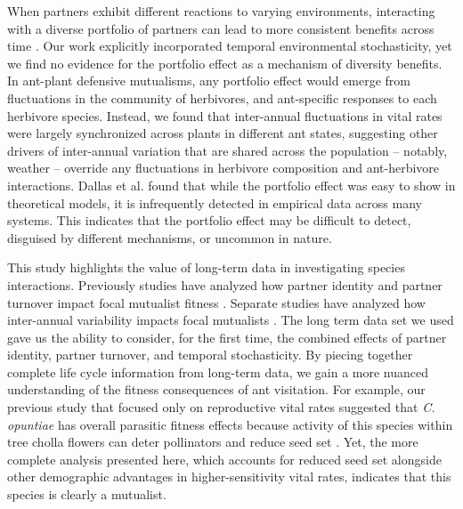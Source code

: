 \documentclass[11pt]{article}
\begin{document}
When partners exhibit different reactions to varying environments, interacting with a diverse portfolio of partners can lead to more consistent benefits across time \citep{Batstone2018}.
Our work explicitly incorporated temporal environmental stochasticity, yet we find no evidence for the portfolio effect as a mechanism of diversity benefits. 
In ant-plant defensive mutualisms, any portfolio effect would emerge from fluctuations in the community of herbivores, and ant-specific responses to each herbivore species. 
Instead, we found that inter-annual fluctuations in vital rates were largely synchronized across plants in different ant states, suggesting other drivers of inter-annual variation that are shared across the population -- notably, weather -- override any fluctuations in herbivore composition and ant-herbivore interactions. 
Dallas et al. \citeyear{dallas2022temporal} found that while the portfolio effect was easy to show in theoretical models, it is infrequently detected in empirical data across many systems. 
This indicates that the portfolio effect may be difficult to detect, disguised by different mechanisms, or uncommon in nature. 

This study highlights the value of long-term data in investigating species interactions. 
Previously studies have analyzed how partner identity and partner turnover impact focal mutualist fitness \citep{Fonseca2003, Dejean2008, Noe1994, Barrett2015, Bruna2014, Trojelsgaard2015}.
Separate studies have analyzed how inter-annual variability impacts focal mutualists \citep{Alonso1998, Alarcon2008, Ollerton2006, Horvitz1990, Lazaro2022}.
The long term data set we used gave us the ability to consider, for the first time, the combined effects of partner identity, partner turnover, and temporal stochasticity. 
By piecing together complete life cycle information from long-term data, we gain a more nuanced understanding of the fitness consequences of ant visitation. 
For example, our previous study that focused only on reproductive vital rates suggested that \textit{C. opuntiae} has overall parasitic fitness effects because activity of this species within tree cholla flowers can deter pollinators and reduce seed set \citep{Ohm2014}. 
Yet, the more complete analysis presented here, which accounts for reduced seed set alongside other demographic advantages in higher-sensitivity vital rates, indicates that this species is clearly a mutualist. 
\end{document}
